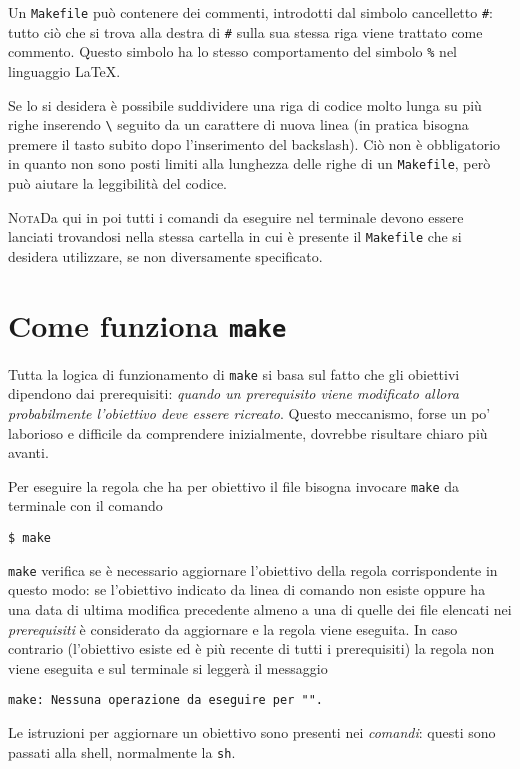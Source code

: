 Un \texttt{Makefile} può contenere dei commenti, introdotti dal simbolo
cancelletto \texttt{\#}: tutto ciò che si trova alla destra di \texttt{\#} sulla
sua stessa riga viene trattato come commento.  Questo simbolo ha lo stesso
comportamento del simbolo \texttt{\%} nel linguaggio \LaTeX{}.

Se lo si desidera è possibile suddividere una riga di codice molto lunga su più
righe inserendo \texttt{\textbackslash{}} seguito da un carattere di nuova linea
(in pratica bisogna premere il tasto  subito dopo l'inserimento del
backslash).  Ciò non è obbligatorio in quanto non sono posti limiti alla
lunghezza delle righe di un \texttt{Makefile}, però può aiutare la leggibilità
del codice.

\textsc{Nota}\quad Da qui in poi tutti i comandi da eseguire nel terminale
devono essere lanciati trovandosi nella stessa cartella in cui è presente il
\texttt{Makefile} che si desidera utilizzare, se non diversamente specificato.

\section{Come funziona \texttt{make}}
\label{sec:come-funziona}

Tutta la logica di funzionamento di \texttt{make} si basa sul fatto che gli
obiettivi dipendono dai prerequisiti:
\emph{quando un prerequisito viene modificato allora probabilmente l'obiettivo
  deve essere ricreato}.
Questo meccanismo, forse un po' laborioso e difficile da comprendere
inizialmente, dovrebbe risultare chiaro più avanti.

Per eseguire la regola che ha per obiettivo il file  bisogna
invocare \texttt{make} da terminale con il comando
\begin{sintassi}
  \small \texttt{\$ make} 
\end{sintassi}
\texttt{make} verifica se è necessario aggiornare l'obiettivo della regola
corrispondente in questo modo: se l'obiettivo indicato da linea di comando non
esiste oppure ha una data di ultima modifica precedente almeno a una di quelle
dei file elencati nei \emph{prerequisiti} è considerato da aggiornare e la
regola viene eseguita.  In caso contrario (l'obiettivo esiste ed è più recente
di tutti i prerequisiti) la regola non viene eseguita e sul terminale si leggerà
il messaggio
\begin{flushleft}
  \texttt{make: Nessuna operazione da eseguire per "}\texttt{".}
\end{flushleft}
Le istruzioni per aggiornare un obiettivo sono
presenti nei \emph{comandi}: questi sono passati alla shell, normalmente la
\texttt{sh}.

